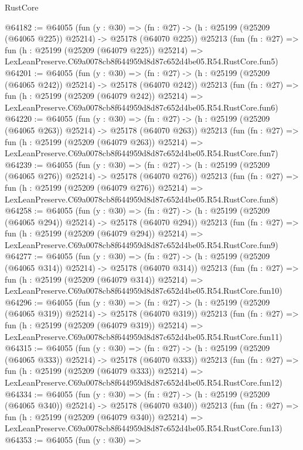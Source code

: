 \begin{lexlean}{RustCore}
\begin{coremodule}
@64182 := @64055
    (fun (y : @30) =>
    (fn : @27) -> (h : @25199 (@25209 (@64065 @225)) @25214) -> @25178 (@64070 @225))
    @25213
    (fun (fn : @27) =>
    fun (h : @25199 (@25209 (@64079 @225)) @25214) =>
    LexLeanPreserve.C69a0078cb8f644959d8d87c652d4be05.R54.RustCore.fun5)
@64201 := @64055
    (fun (y : @30) =>
    (fn : @27) -> (h : @25199 (@25209 (@64065 @242)) @25214) -> @25178 (@64070 @242))
    @25213
    (fun (fn : @27) =>
    fun (h : @25199 (@25209 (@64079 @242)) @25214) =>
    LexLeanPreserve.C69a0078cb8f644959d8d87c652d4be05.R54.RustCore.fun6)
@64220 := @64055
    (fun (y : @30) =>
    (fn : @27) -> (h : @25199 (@25209 (@64065 @263)) @25214) -> @25178 (@64070 @263))
    @25213
    (fun (fn : @27) =>
    fun (h : @25199 (@25209 (@64079 @263)) @25214) =>
    LexLeanPreserve.C69a0078cb8f644959d8d87c652d4be05.R54.RustCore.fun7)
@64239 := @64055
    (fun (y : @30) =>
    (fn : @27) -> (h : @25199 (@25209 (@64065 @276)) @25214) -> @25178 (@64070 @276))
    @25213
    (fun (fn : @27) =>
    fun (h : @25199 (@25209 (@64079 @276)) @25214) =>
    LexLeanPreserve.C69a0078cb8f644959d8d87c652d4be05.R54.RustCore.fun8)
@64258 := @64055
    (fun (y : @30) =>
    (fn : @27) -> (h : @25199 (@25209 (@64065 @294)) @25214) -> @25178 (@64070 @294))
    @25213
    (fun (fn : @27) =>
    fun (h : @25199 (@25209 (@64079 @294)) @25214) =>
    LexLeanPreserve.C69a0078cb8f644959d8d87c652d4be05.R54.RustCore.fun9)
@64277 := @64055
    (fun (y : @30) =>
    (fn : @27) -> (h : @25199 (@25209 (@64065 @314)) @25214) -> @25178 (@64070 @314))
    @25213
    (fun (fn : @27) =>
    fun (h : @25199 (@25209 (@64079 @314)) @25214) =>
    LexLeanPreserve.C69a0078cb8f644959d8d87c652d4be05.R54.RustCore.fun10)
@64296 := @64055
    (fun (y : @30) =>
    (fn : @27) -> (h : @25199 (@25209 (@64065 @319)) @25214) -> @25178 (@64070 @319))
    @25213
    (fun (fn : @27) =>
    fun (h : @25199 (@25209 (@64079 @319)) @25214) =>
    LexLeanPreserve.C69a0078cb8f644959d8d87c652d4be05.R54.RustCore.fun11)
@64315 := @64055
    (fun (y : @30) =>
    (fn : @27) -> (h : @25199 (@25209 (@64065 @333)) @25214) -> @25178 (@64070 @333))
    @25213
    (fun (fn : @27) =>
    fun (h : @25199 (@25209 (@64079 @333)) @25214) =>
    LexLeanPreserve.C69a0078cb8f644959d8d87c652d4be05.R54.RustCore.fun12)
@64334 := @64055
    (fun (y : @30) =>
    (fn : @27) -> (h : @25199 (@25209 (@64065 @340)) @25214) -> @25178 (@64070 @340))
    @25213
    (fun (fn : @27) =>
    fun (h : @25199 (@25209 (@64079 @340)) @25214) =>
    LexLeanPreserve.C69a0078cb8f644959d8d87c652d4be05.R54.RustCore.fun13)
@64353 := @64055
    (fun (y : @30) =>

\end{coremodule}
\end{lexlean}
